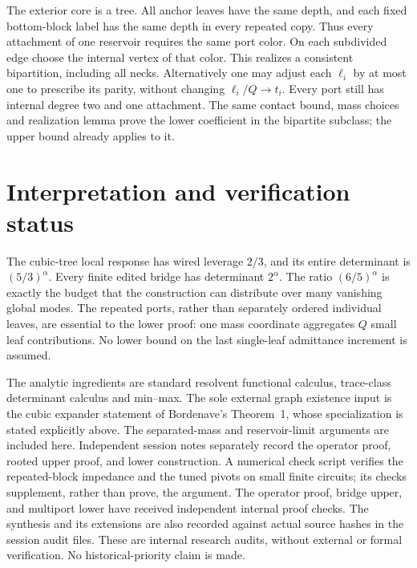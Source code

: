 \documentclass[11pt]{article}
\begin{document}
The exterior core is a tree. All anchor leaves have the same depth,
and each fixed bottom-block label has the same depth in every repeated
copy. Thus every attachment of one reservoir requires the same port
color. On each subdivided edge choose the internal vertex of that
color. This realizes a consistent bipartition, including all necks.
Alternatively one may adjust each $\ell_i$ by at most one to prescribe
its parity, without changing $\ell_i/Q\to t_i$. Every port still has
internal degree two and one attachment. The same contact bound, mass
choices and realization lemma prove the lower coefficient in the
bipartite subclass; the upper bound already applies to it.

\section{Interpretation and verification status}
The cubic-tree local response has wired leverage $2/3$, and its
entire determinant is $(5/3)^\alpha$. Every finite edited bridge has
determinant $2^\alpha$. The ratio $(6/5)^\alpha$ is exactly the budget
that the construction can distribute over many vanishing global modes.
The repeated ports, rather than separately ordered individual leaves,
are essential to the lower proof: one mass coordinate aggregates $Q$
small leaf contributions. No lower bound on the last single-leaf
admittance increment is assumed.

The analytic ingredients are standard resolvent functional calculus,
trace-class determinant calculus and min--max. The sole external graph
existence input is the cubic expander statement of Bordenave's
Theorem~1, whose specialization is stated explicitly above. The
separated-mass and reservoir-limit arguments are included here.
Independent session notes separately record the operator proof,
rooted upper proof, and lower construction. A numerical check script
verifies the repeated-block impedance and the tuned pivots on small
finite circuits; its checks supplement, rather than prove, the argument.
The operator proof, bridge upper, and multiport lower have received
independent internal proof checks. The synthesis and its extensions are
also recorded against actual source hashes in the session audit files.
These are internal research audits, without external or formal
verification. No historical-priority claim is made.
\end{document}
